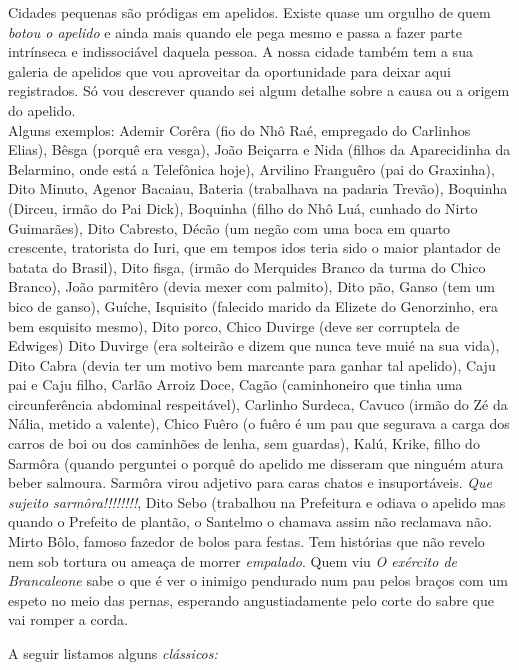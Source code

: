 \documentclass[12pt,brazil,]{book}
\begin{document}
Cidades pequenas são pródigas em apelidos. Existe quase um orgulho de
quem \emph{botou o apelido} e ainda mais quando ele pega mesmo e passa a
fazer parte intrínseca e indissociável daquela pessoa. A nossa cidade
também tem a sua galeria de apelidos que vou aproveitar da oportunidade
para deixar aqui registrados. Só vou descrever quando sei algum detalhe
sobre a causa ou a origem do apelido.\\
Alguns exemplos: Ademir Corêra (fio do Nhô Raé, empregado do Carlinhos
Elias), Bêsga (porquê era vesga), João Beiçarra e Nida (filhos da
Aparecidinha da Belarmino, onde está a Telefônica hoje), Arvilino
Franguêro (pai do Graxinha), Dito Minuto, Agenor Bacaiau, Bateria
(trabalhava na padaria Trevão), Boquinha (Dirceu, irmão do Pai Dick),
Boquinha (filho do Nhô Luá, cunhado do Nirto Guimarães), Dito Cabresto,
Décão (um negão com uma boca em quarto crescente, tratorista do Iuri,
que em tempos idos teria sido o maior plantador de batata do Brasil),
Dito fisga, (irmão do Merquides Branco da turma do Chico Branco), João
parmitêro (devia mexer com palmito), Dito pão, Ganso (tem um bico de
ganso), Guíche, Isquisito (falecido marido da Elizete do Genorzinho, era
bem esquisito mesmo), Dito porco, Chico Duvirge (deve ser corruptela de
Edwiges) Dito Duvirge (era solteirão e dizem que nunca teve muié na sua
vida), Dito Cabra (devia ter um motivo bem marcante para ganhar tal
apelido), Caju pai e Caju filho, Carlão Arroiz Doce, Cagão (caminhoneiro
que tinha uma circunferência abdominal respeitável), Carlinho Surdeca,
Cavuco (irmão do Zé da Nália, metido a valente), Chico Fuêro (o fuêro é
um pau que segurava a carga dos carros de boi ou dos caminhões de lenha,
sem guardas), Kalú, Krike, filho do Sarmôra (quando perguntei o porquê
do apelido me disseram que ninguém atura beber salmoura. Sarmôra virou
adjetivo para caras chatos e insuportáveis. \emph{Que sujeito
sarmôra!!!!!!!!}, Dito Sebo (trabalhou na Prefeitura e odiava o apelido
mas quando o Prefeito de plantão, o Santelmo o chamava assim não
reclamava não. Mirto Bôlo, famoso fazedor de bolos para festas. Tem
histórias que não revelo nem sob tortura ou ameaça de morrer
\emph{empalado}. Quem viu \emph{O exército de Brancaleone} sabe o que é
ver o inimigo pendurado num pau pelos braços com um espeto no meio das
pernas, esperando angustiadamente pelo corte do sabre que vai romper a
corda.

A seguir listamos alguns \emph{clássicos:}
\end{document}
